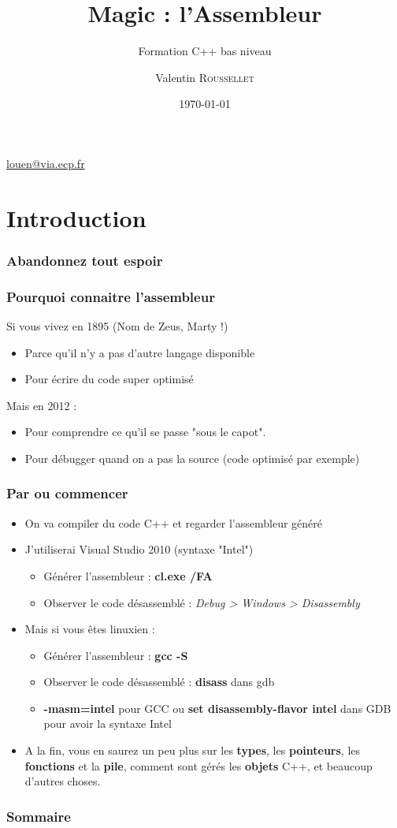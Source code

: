 \documentclass{beamer}
\title{Magic : l'Assembleur}
\subtitle{Formation C++ bas niveau}
\author{Valentin \textsc{Roussellet}}
\institute[VIA]{Centrale Reseaux}
\date{\today}
\begin{document}
\begin{frame}
  \titlepage
\begin{center}
\href{mailto:louen@via.ecp.fr}{louen@via.ecp.fr}
\end{center}
\end{frame}
\section*{Introduction}
\begin{frame}
    \frametitle{Abandonnez tout espoir}
\end{frame}

\begin{frame}
    \frametitle{Pourquoi connaitre l'assembleur}
Si vous vivez en 1895 (Nom de Zeus, Marty !)
\begin{itemize}
 \item Parce qu'il n'y a pas d'autre langage disponible
 \item Pour écrire du code super optimisé 
\end{itemize}
\pause
Mais en 2012 :
\begin{itemize}
 \item Pour comprendre ce qu'il se passe "sous le capot".
 \item Pour débugger quand on a pas la source (code optimisé par exemple)
\end{itemize}
\end{frame}

\begin{frame}
    \frametitle{Par ou commencer}
\begin{itemize}
 \item On va compiler du code C++ et regarder l'assembleur généré 
 \item J'utiliserai Visual Studio 2010 (syntaxe "Intel")
        \begin{itemize}
         \item Générer l'assembleur : \textbf{cl.exe /FA}
         \item Observer le code désassemblé : \textit{Debug > Windows > Disassembly}  
        \end{itemize}
        \pause
 \item Mais si vous êtes linuxien :
        \begin{itemize}
         \item Générer l'assembleur : \textbf{gcc -S}
         \item Observer le code désassemblé : \textbf{disass} dans gdb
         \item \textbf{-masm=intel} pour GCC ou \textbf{set disassembly-flavor intel} dans GDB pour avoir la syntaxe Intel  
        \end{itemize}
\pause
\item A la fin, vous en saurez un peu plus sur les \textbf{types}, les \textbf{pointeurs}, les \textbf{fonctions} et la \textbf{pile}, comment sont gérés les \textbf{objets} C++, et beaucoup d'autres choses.
\end{itemize}
\end{frame}
\begin{frame}
    \frametitle{Sommaire}
    \tiny{\tableofcontents}
\end{frame}
\end{document}
